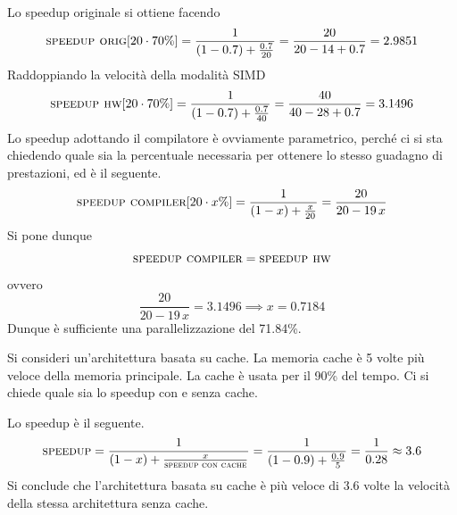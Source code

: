 \begin{solution}
	Lo speedup originale si ottiene facendo
	\begin{equation*}
		\textsc{speedup orig}[20 \cdot 70 \%] = \frac{1}{(1-0.7)+\frac{0.7}{20}} = \frac{20}{20-14+0.7}=2.9851
	\end{equation*}
	Raddoppiando la velocità della modalità SIMD
	\begin{equation*}
		\textsc{speedup hw}[20 \cdot 70\%] = \frac{1}{(1-0.7)+\frac{0.7}{40}}=\frac{40}{40-28+0.7}=3.1496
	\end{equation*}
	Lo speedup adottando il compilatore è ovviamente parametrico, perché ci si sta chiedendo quale sia la percentuale necessaria per ottenere lo stesso guadagno di prestazioni, ed è il seguente.
	\begin{equation*}
		\textsc{speedup compiler}[20\cdot x\%] = \frac{1}{(1-x)+\frac{x}{20}}=\frac{20}{20-19\, x}
	\end{equation*}
	Si pone dunque
	\[\textsc{speedup compiler}= \textsc{speedup hw}\]
	ovvero
	\begin{equation*}
		\frac{20}{20-19\, x} = 3.1496 \implies x = 0.7184
	\end{equation*}
	Dunque è sufficiente una parallelizzazione del 71.84\%.
\end{solution}
\begin{exercise}
	Si consideri un'architettura basata su cache. La memoria cache è 5 volte più veloce della memoria principale. La cache è usata per il 90\% del tempo. Ci si chiede quale sia lo speedup con e senza cache.
\end{exercise}
\begin{solution}
	Lo speedup è il seguente.
	\begin{equation*}
		\textsc{speedup} = \frac{1}{(1-x)+\frac{x}{\textsc{speedup con cache}}} = \frac{1}{(1-0.9)+\frac{0.9}{5}}=\frac{1}{0.28}\approx 3.6
	\end{equation*}
	Si conclude che l'architettura basata su cache è più veloce di 3.6 volte la velocità della stessa architettura senza cache.
\end{solution}

